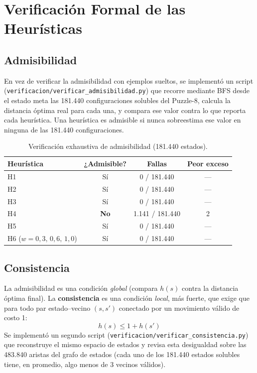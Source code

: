 \documentclass[11pt]{article}
\begin{document}
\section{Verificación Formal de las Heurísticas}
\label{sec:verificacion}

\subsection{Admisibilidad}
En vez de verificar la admisibilidad con ejemplos sueltos, se implementó un
script (\texttt{verificacion/verificar\_admisibilidad.py}) que recorre
mediante BFS desde el estado meta las 181.440 configuraciones solubles del
Puzzle-8, calcula la distancia óptima real para cada una, y compara ese valor
contra lo que reporta cada heurística. Una heurística es admisible si nunca
sobreestima ese valor en ninguna de las 181.440 configuraciones.

\begin{table}[H]
\centering
\caption{Verificación exhaustiva de admisibilidad (181.440 estados).}
\begin{tabular}{lccc}
\toprule
Heurística & ¿Admisible? & Fallas & Peor exceso \\
\midrule
H1 & Sí & 0 / 181.440 & --- \\
H2 & Sí & 0 / 181.440 & --- \\
H3 & Sí & 0 / 181.440 & --- \\
H4 & \textbf{No} & 1.141 / 181.440 & 2 \\
H5 & Sí & 0 / 181.440 & --- \\
H6 ($w=0{,}3,\,0{,}6,\,1{,}0$) & Sí & 0 / 181.440 & --- \\
\bottomrule
\end{tabular}
\end{table}

\subsection{Consistencia}
La admisibilidad es una condición \emph{global} (compara $h(s)$ contra la
distancia óptima final). La \textbf{consistencia} es una condición
\emph{local}, más fuerte, que exige que para todo par estado--vecino
$(s,s')$ conectado por un movimiento válido de costo 1:
\[
h(s) \le 1 + h(s')
\]
Se implementó un segundo script
(\texttt{verificacion/verificar\_consistencia.py}) que reconstruye el mismo
espacio de estados y revisa esta desigualdad sobre las 483.840 aristas del
grafo de estados (cada uno de los 181.440 estados solubles tiene, en
promedio, algo menos de 3 vecinos válidos).
\end{document}
